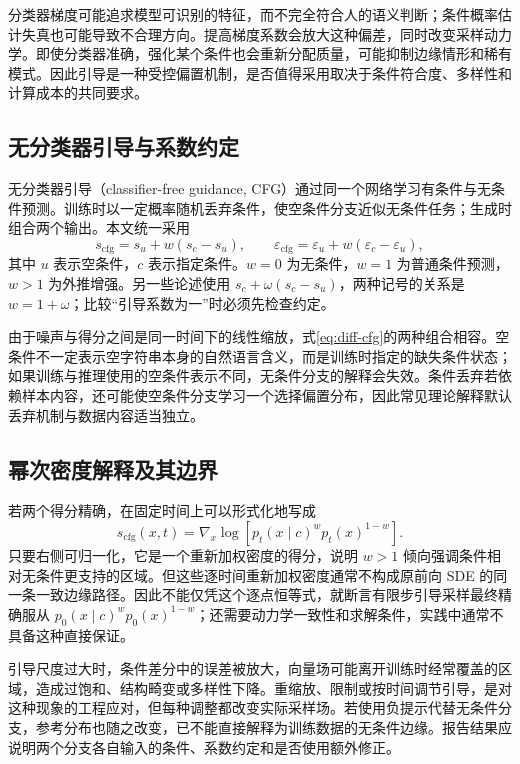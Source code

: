 \documentclass[UTF8,12pt,a4paper,fontset=fandol]{ctexart}
\begin{document}
分类器梯度可能追求模型可识别的特征，而不完全符合人的语义判断；条件概率估计失真也可能导致不合理方向。提高梯度系数会放大这种偏差，同时改变采样动力学。即使分类器准确，强化某个条件也会重新分配质量，可能抑制边缘情形和稀有模式。因此引导是一种受控偏置机制，是否值得采用取决于条件符合度、多样性和计算成本的共同要求。

\subsection{无分类器引导与系数约定}
无分类器引导（classifier-free guidance, CFG）通过同一个网络学习有条件与无条件预测\cite{ho2022cfg}。训练时以一定概率随机丢弃条件，使空条件分支近似无条件任务；生成时组合两个输出。本文统一采用
\begin{equation}
 s_{\mathrm{cfg}}=s_u+w(s_c-s_u),\qquad
 \varepsilon_{\mathrm{cfg}}=\varepsilon_u+w(\varepsilon_c-\varepsilon_u),
 \label{eq:diff-cfg}
\end{equation}
其中 $u$ 表示空条件，$c$ 表示指定条件。$w=0$ 为无条件，$w=1$ 为普通条件预测，$w>1$ 为外推增强。另一些论述使用 $s_c+\omega(s_c-s_u)$，两种记号的关系是 $w=1+\omega$；比较“引导系数为一”时必须先检查约定。

由于噪声与得分之间是同一时间下的线性缩放，式\eqref{eq:diff-cfg}的两种组合相容。空条件不一定表示空字符串本身的自然语言含义，而是训练时指定的缺失条件状态；如果训练与推理使用的空条件表示不同，无条件分支的解释会失效。条件丢弃若依赖样本内容，还可能使空条件分支学习一个选择偏置分布，因此常见理论解释默认丢弃机制与数据内容适当独立。

\subsection{幂次密度解释及其边界}
若两个得分精确，在固定时间上可以形式化地写成
\[
 s_{\mathrm{cfg}}(x,t)=\nabla_x\log\left[p_t(x\mid c)^w p_t(x)^{1-w}\right].
\]
只要右侧可归一化，它是一个重新加权密度的得分，说明 $w>1$ 倾向强调条件相对无条件更支持的区域。但这些逐时间重新加权密度通常不构成原前向 SDE 的同一条一致边缘路径。因此不能仅凭这个逐点恒等式，就断言有限步引导采样最终精确服从 $p_0(x\mid c)^wp_0(x)^{1-w}$；还需要动力学一致性和求解条件，实践中通常不具备这种直接保证。

引导尺度过大时，条件差分中的误差被放大，向量场可能离开训练时经常覆盖的区域，造成过饱和、结构畸变或多样性下降。重缩放、限制或按时间调节引导，是对这种现象的工程应对，但每种调整都改变实际采样场。若使用负提示代替无条件分支，参考分布也随之改变，已不能直接解释为训练数据的无条件边缘。报告结果应说明两个分支各自输入的条件、系数约定和是否使用额外修正。
\end{document}
